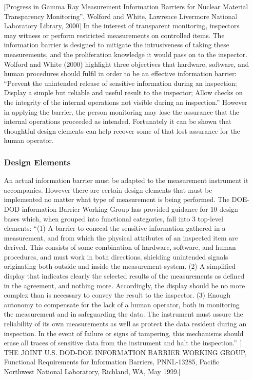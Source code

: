 \documentclass[twocolumn,a4paper]{article}
\begin{document}
[Progress in Gamma Ray Measurement Information Barriers for Nuclear
  Material Transparency Monitoring'', Wolford and White, Lawrence
  Livermore National Laboratory Library, 2000] In the interest of
transparent monitoring, inspectors may witness or perform restricted
measurements on controlled items. The information barrier is designed
to mitigate the intrusiveness of taking these measurements, and the
proliferation knowledge it would pass on to the inspector. Wolford and
White (2000) highlight three objectives that hardware, software, and
human procedures should fulfil in order to be an effective
information barrier: ``Prevent the unintended release of sensitive
information during an inspection; Display a simple but reliable and
useful result to the inspector; Allow checks on the integrity of the
internal operations not visible during an inspection.''  However in
applying the barrier, the person monitoring may lose the assurance
that the internal operations proceeded as intended. Fortunately it can
be shown that thoughtful design elements can help recover some of that
lost assurance for the human operator.

\subsubsection{Design Elements}
An actual information barrier must be adapted to the measurement
instrument it accompanies. However there are certain design elements
that must be implemented no matter what type of measurement is being
performed. The DOE-DOD information Barrier Working Group has provided
guidance for 10 design bases which, when grouped into functional
categories, fall into 3 top-level elements: ``(1) A barrier to conceal
the sensitive information gathered in a measurement, and from which
the physical attributes of an inspected item are derived. This
consists of some combination of hardware, software, and human
procedures, and must work in both directions, shielding unintended
signals originating both outside and inside the measurement system.
(2) A simplified display that indicates clearly the selected results
of the measurements as defined in the agreement, and nothing
more. Accordingly, the display should be no more complex than is
necessary to convey the result to the inspector.  (3) Enough autonomy
to compensate for the lack of a human operator, both in monitoring the
measurement and in safeguarding the data. The instrument must assure
the reliability of its own measurements as well as protect the data
resident during an inspection. In the event of failure or signs of
tampering, this mechanisms should erase all traces of sensitive data
from the instrument and halt the inspection.''  [ THE JOINT
  U.S. DOD-DOE INFORMATION BARRIER WORKING GROUP, Functional
  Requirements for Information Barriers, PNNL-13285, Pacific Northwest
  National Laboratory, Richland, WA, May 1999.]
\end{document}
